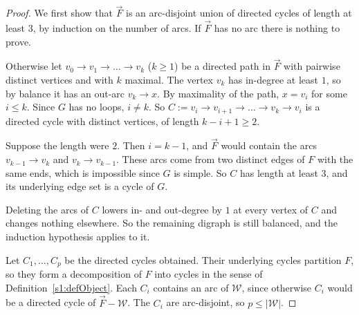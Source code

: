 \begin{proof}
We first show that $\vec F$ is an arc-disjoint union of directed cycles of length at least $3$, by induction on the number of arcs. If $\vec F$ has no arc there is nothing to prove.

Otherwise let $v_0\to v_1\to\dots\to v_k$ ($k\ge1$) be a directed path in $\vec F$ with pairwise distinct vertices and with $k$ maximal. The vertex $v_k$ has in-degree at least $1$, so by balance it has an out-arc $v_k\to x$. By maximality of the path, $x=v_i$ for some $i\le k$. Since $G$ has no loops, $i\neq k$. So $C:=v_i\to v_{i+1}\to\dots\to v_k\to v_i$ is a directed cycle with distinct vertices, of length $k-i+1\ge2$.

Suppose the length were $2$. Then $i=k-1$, and $\vec F$ would contain the arcs $v_{k-1}\to v_k$ and $v_k\to v_{k-1}$. These arcs come from two distinct edges of $F$ with the same ends, which is impossible since $G$ is simple. So $C$ has length at least $3$, and its underlying edge set is a cycle of $G$.

Deleting the arcs of $C$ lowers in- and out-degree by $1$ at every vertex of $C$ and changes nothing elsewhere. So the remaining digraph is still balanced, and the induction hypothesis applies to it.

Let $C_1,\dots,C_p$ be the directed cycles obtained. Their underlying cycles partition $F$, so they form a decomposition of $F$ into cycles in the sense of Definition~\ref{s1:defObject}. Each $C_i$ contains an arc of $\mathcal W$, since otherwise $C_i$ would be a directed cycle of $\vec F-\mathcal W$. The $C_i$ are arc-disjoint, so $p\le|\mathcal W|$.
\end{proof}

